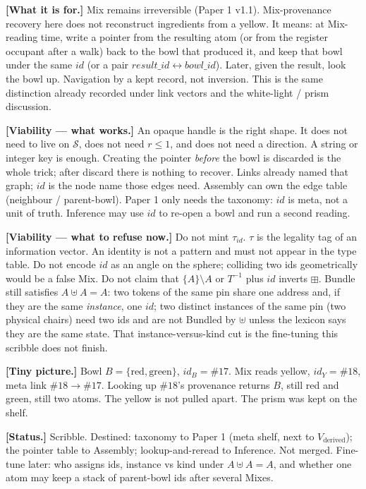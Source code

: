 \documentclass[11pt]{article}
\begin{document}
\textbf{[What it is for.]} Mix remains irreversible (Paper 1 v1.1).
Mix-provenance recovery here does not reconstruct ingredients from a
yellow. It means: at Mix-reading time, write a pointer from the
resulting atom (or from the register occupant after a walk) back to
the bowl that produced it, and keep that bowl under the same $id$ (or
a pair $result\_id \leftrightarrow bowl\_id$). Later, given the
result, look the bowl up. Navigation by a kept record, not inversion.
This is the same distinction already recorded under link vectors and
the white-light / prism discussion.

\textbf{[Viability --- what works.]}
An opaque handle is the right shape. It does not need to live on
$\mathcal{S}$, does not need $r\le 1$, and does not need a direction.
A string or integer key is enough. Creating the pointer \emph{before}
the bowl is discarded is the whole trick; after discard there is
nothing to recover. Links already named that graph; $id$ is the
node name those edges need. Assembly can own the edge table
(neighbour / parent-bowl). Paper 1 only needs the taxonomy: $id$ is
meta, not a unit of truth. Inference may use $id$ to re-open a bowl
and run a second reading.

\textbf{[Viability --- what to refuse now.]}
Do not mint $\tau_{id}$. $\tau$ is the legality tag of an information
vector. An identity is not a pattern and must not appear in the type
table. Do not encode $id$ as an angle on the sphere; colliding two
ids geometrically would be a false Mix. Do not claim that
$\{A\}\setminus A$ or $T^{-1}$ plus $id$ inverts $\boxplus$. Bundle
still satisfies $A\uplus A=A$: two tokens of the same pin share one
address and, if they are the same \emph{instance}, one $id$; two
distinct instances of the same pin (two physical chairs) need two
ids and are not Bundled by $\uplus$ unless the lexicon says they
are the same state. That instance-versus-kind cut is the fine-tuning
this scribble does not finish.

\textbf{[Tiny picture.]}
Bowl $B=\{\mathrm{red},\mathrm{green}\}$, $id_B=\#17$.
Mix reads yellow, $id_Y=\#18$, meta link $\#18\to\#17$.
Looking up $\#18$'s provenance returns $B$, still red and green,
still two atoms. The yellow is not pulled apart. The prism was kept
on the shelf.

\textbf{[Status.]} Scribble. Destined: taxonomy to Paper 1 (meta
shelf, next to $V_{\mathrm{derived}}$); the pointer table to
Assembly; lookup-and-reread to Inference. Not merged. Fine-tune
later: who assigns ids, instance vs kind under $A\uplus A=A$, and
whether one atom may keep a stack of parent-bowl ids after several
Mixes.
\end{document}
